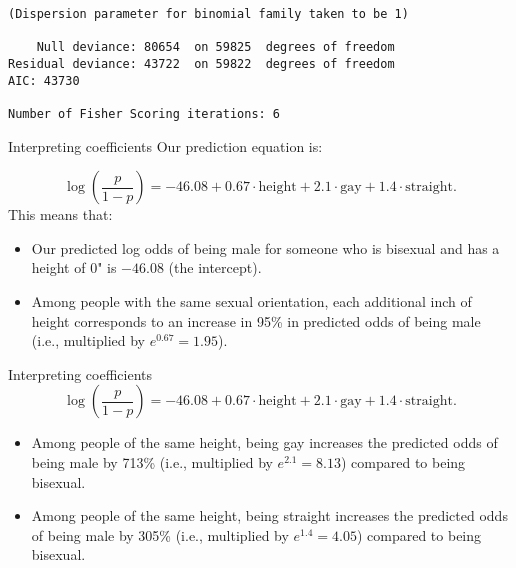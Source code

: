 \documentclass{beamer}\usepackage[]{graphicx}\usepackage[]{color}
\makeatletter
\newcommand{\hlopt}[1]{\textcolor[rgb]{1,0.894,0.769}{#1}}%
\newcommand{\hlstd}[1]{\textcolor[rgb]{1,0.894,0.769}{#1}}%
\newcommand{\hlkwb}[1]{\textcolor[rgb]{0.804,0.776,0.451}{#1}}%
\newcommand{\hlkwd}[1]{\textcolor[rgb]{1,0.78,0.769}{#1}}%
\newenvironment{kframe}{%
 \def\at@end@of@kframe{}%
 \ifinner\ifhmode%
  \def\at@end@of@kframe{\end{minipage}}%
  \begin{minipage}{\columnwidth}%
 \fi\fi%
 \def\FrameCommand##1{\hskip\@totalleftmargin \hskip-\fboxsep
 \colorbox{shadecolor}{##1}\hskip-\fboxsep
     \hskip-\linewidth \hskip-\@totalleftmargin \hskip\columnwidth}%
 \MakeFramed {\advance\hsize-\width
   \@totalleftmargin\z@ \linewidth\hsize
   \@setminipage}}%
 {\par\unskip\endMakeFramed%
 \at@end@of@kframe}
\newenvironment{knitrout}{}{} %
\makeatother
\begin{document}
\begin{darkframes}
\begin{frame}[fragile]
\begin{knitrout}
\begin{kframe}
\begin{verbatim}
(Dispersion parameter for binomial family taken to be 1)

    Null deviance: 80654  on 59825  degrees of freedom
Residual deviance: 43722  on 59822  degrees of freedom
AIC: 43730

Number of Fisher Scoring iterations: 6
\end{verbatim}
\end{kframe}
\end{knitrout}
    \end{frame}

    \begin{frame}{Interpreting coefficients}
      Our prediction equation is:
      
      \[
        \log\left(\frac{p}{1-p}\right) =
          -46.08 +
          0.67\cdot\text{height} +
          2.1\cdot\text{gay} +
          1.4\cdot\text{straight}.
      \]
      This means that:
      \begin{itemize}[<+->]
        \item Our predicted log odds of being male for someone who is bisexual and has a height of 0" is $-46.08$ (the intercept).
        \item Among people with the same sexual orientation, each additional inch of height corresponds to an increase in 95\% in predicted odds of being male (i.e., multiplied by $e^{0.67} = 1.95$).
      \end{itemize}
    \end{frame}

    \begin{frame}{Interpreting coefficients}
      \[
        \log\left(\frac{p}{1-p}\right) =
          -46.08 +
          0.67\cdot\text{height} +
          2.1\cdot\text{gay} +
          1.4\cdot\text{straight}.
      \]
      \begin{itemize}[<+->]
        \item Among people of the same height, being gay increases the predicted odds of being male by 713\% (i.e., multiplied by $e^{2.1} = 8.13$) compared to being bisexual.
        \item Among people of the same height, being straight increases the predicted odds of being male by 305\% (i.e., multiplied by $e^{1.4} = 4.05$) compared to being bisexual.
      \end{itemize}
    \end{frame}

\end{darkframes}
\end{document}

